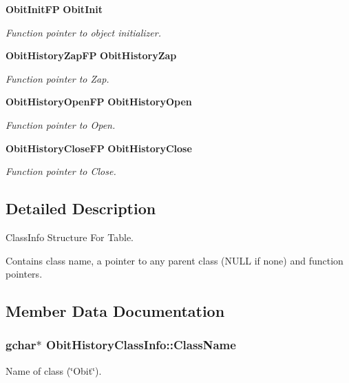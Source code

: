 \begin{CompactItemize}
{\bf Obit\-Init\-FP} {\bf Obit\-Init}
\begin{CompactList}\small\item\em Function pointer to object initializer. \item\end{CompactList}\item 
{\bf Obit\-History\-Zap\-FP} {\bf Obit\-History\-Zap}
\begin{CompactList}\small\item\em Function pointer to Zap. \item\end{CompactList}\item 
{\bf Obit\-History\-Open\-FP} {\bf Obit\-History\-Open}
\begin{CompactList}\small\item\em Function pointer to Open. \item\end{CompactList}\item 
{\bf Obit\-History\-Close\-FP} {\bf Obit\-History\-Close}
\begin{CompactList}\small\item\em Function pointer to Close. \item\end{CompactList}\end{CompactItemize}


\subsection{Detailed Description}
Class\-Info Structure For Table. 

Contains class name, a pointer to any parent class (NULL if none) and function pointers. 



\subsection{Member Data Documentation}
\subsubsection{\setlength{\rightskip}{0pt plus 5cm}gchar$\ast$ {\bf Obit\-History\-Class\-Info::Class\-Name}}\label{structObitHistoryClassInfo_o2}


Name of class (\char`\"{}Obit\char`\"{}). 

